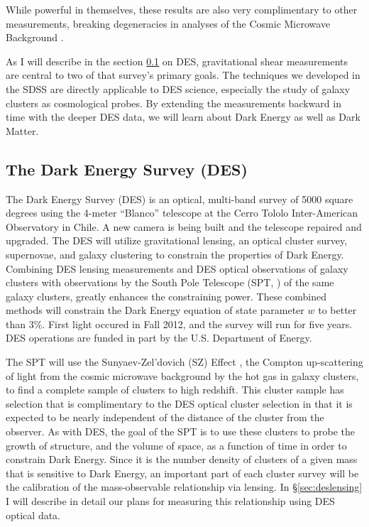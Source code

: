 \documentclass[12pt]{article}
\newcommand{\commissdate}{Fall 2012}
\begin{document}
While powerful in themselves, these results are also very complimentary to
other measurements, breaking degeneracies in analyses of the Cosmic Microwave
Background \cite{KomatsuWMAPCosmo09}. 

As I will describe in the section \ref{sec:des} on DES, gravitational shear
measurements are central to two of that survey's primary goals.  The techniques
we developed in the SDSS are directly applicable to DES science, especially the
study of galaxy clusters as cosmological probes.  By extending the measurements
backward in time with the deeper DES data, we will learn about Dark Energy as
well as Dark Matter.


\subsection{The Dark Energy Survey (DES)} \label{sec:des}

The Dark Energy Survey (DES) is an optical, multi-band survey of 5000 square
degrees using the 4-meter ``Blanco'' telescope at the Cerro Tololo
Inter-American Observatory in Chile. A new camera is being built and the
telescope repaired and upgraded.  The DES will utilize gravitational lensing,
an optical cluster survey, supernovae, and galaxy clustering to constrain the
properties of Dark Energy.  Combining DES lensing measurements and DES optical
observations of galaxy clusters with observations by the South Pole Telescope
(SPT, \cite{SPT04}) of the same galaxy clusters, greatly enhances the
constraining power.  These combined methods will constrain the Dark Energy
equation of state parameter $w$ to better than 3\%.  First light occured in
\commissdate, and the survey will run for five years.  DES operations are
funded in part by the U.S.  Department of Energy. 


The SPT will use the Sunyaev-Zel'dovich (SZ) Effect \cite{Birkinshaw99}, the
Compton up-scattering of light from the cosmic microwave background by the hot
gas in galaxy clusters, to find a complete sample of clusters to high redshift.
This cluster sample has selection that is complimentary to the DES optical
cluster selection in that it is expected to be nearly independent of the
distance of the cluster from the observer.  As with DES, the goal of the SPT is
to use these clusters to probe the growth of structure, and the volume of
space, as a function of time in order to constrain Dark Energy.  Since it is
the number density of clusters of a given mass that is sensitive to Dark
Energy, an important part of each cluster survey will be the calibration of the
mass-observable relationship via lensing.  In \S \ref{sec:deslensing} I will
describe in detail our plans for measuring this relationship using DES optical
data.
\end{document}
